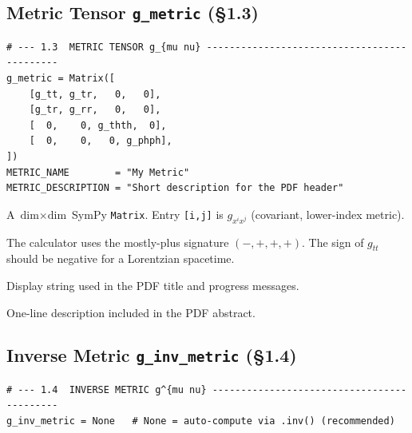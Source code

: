 \documentclass[11pt,a4paper]{article}
\newcommand{\code}[1]{\texttt{\small#1}}
\begin{document}
\subsection{Metric Tensor \code{g\_metric} (\S1.3)}
\label{sec:cfg-metric}

\begin{lstlisting}
# --- 1.3  METRIC TENSOR g_{mu nu} --------------------------------------------
g_metric = Matrix([
    [g_tt, g_tr,   0,   0],
    [g_tr, g_rr,   0,   0],
    [  0,    0, g_thth,  0],
    [  0,    0,   0, g_phph],
])
METRIC_NAME        = "My Metric"
METRIC_DESCRIPTION = "Short description for the PDF header"
\end{lstlisting}

\begin{description}[leftmargin=2cm,style=nextline]
  \item[\code{g\_metric}]
    A $\text{dim}\times\text{dim}$ SymPy \code{Matrix}.  Entry
    \code{[i,j]} is $g_{x^i x^j}$ (covariant, lower-index metric).

  \item[Signature convention]
    The calculator uses the mostly-plus signature
    $(-,+,+,+)$.  The sign of $g_{tt}$ should be negative for a
    Lorentzian spacetime.

  \item[\code{METRIC\_NAME}]
    Display string used in the PDF title and progress messages.

  \item[\code{METRIC\_DESCRIPTION}]
    One-line description included in the PDF abstract.
\end{description}

\subsection{Inverse Metric \code{g\_inv\_metric} (\S1.4)}
\label{sec:cfg-ginv}

\begin{lstlisting}
# --- 1.4  INVERSE METRIC g^{mu nu} -------------------------------------------
g_inv_metric = None   # None = auto-compute via .inv() (recommended)
\end{lstlisting}
\end{document}
